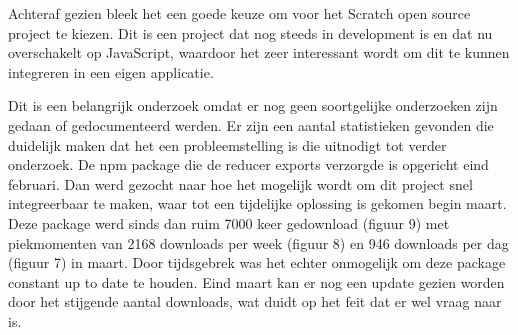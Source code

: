 Achteraf gezien bleek het een goede keuze om voor het Scratch open source project te kiezen. Dit is een project dat nog steeds in development is en dat nu overschakelt op JavaScript, waardoor het zeer interessant wordt om dit te kunnen integreren in een eigen applicatie. 

Dit is een belangrijk onderzoek omdat er nog geen soortgelijke onderzoeken zijn gedaan of gedocumenteerd werden.
Er zijn een aantal statistieken gevonden die duidelijk maken dat het een probleemstelling is die uitnodigt tot verder onderzoek. De npm package die de reducer exports verzorgde is opgericht eind februari. Dan werd gezocht naar hoe het mogelijk wordt om dit project snel integreerbaar te maken, waar tot een tijdelijke oplossing is gekomen begin maart. Deze package werd sinds dan ruim 7000 keer gedownload (figuur 9) met piekmomenten van 2168 downloads per week (figuur 8) en 946 downloads per dag (figuur 7) in maart. Door tijdsgebrek was het echter onmogelijk om deze package constant up to date te houden. Eind maart kan er nog een update gezien worden door het stijgende aantal downloads, wat duidt op het feit dat er wel vraag naar is.